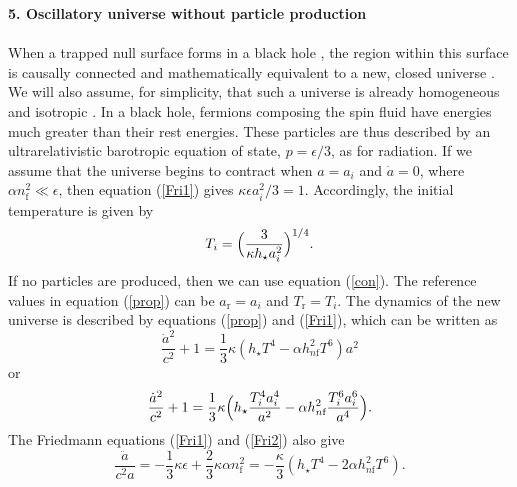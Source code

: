 \documentclass[prd,onecolumn,nofootinbib]{revtex4}
\begin{document}
{\bf 5. Oscillatory universe without particle production}\\ \\
When a trapped null surface forms in a black hole \cite{HoVi}, the region within this surface is causally connected and mathematically equivalent to a new, closed universe \cite{torsion1,num}.
We will also assume, for simplicity, that such a universe is already homogeneous and isotropic \cite{HoVi}.
In a black hole, fermions composing the spin fluid have energies much greater than their rest energies.
These particles are thus described by an ultrarelativistic barotropic equation of state, $p=\epsilon/3$, as for radiation.
If we assume that the universe begins to contract when $a=a_i$ and $\dot{a}=0$, where $\alpha n_\textrm{f}^2\ll\epsilon$, then equation (\ref{Fri1}) gives $\kappa\epsilon a_i^2/3=1$.
Accordingly, the initial temperature is given by
\begin{equation}
T_i=\Bigl(\frac{3}{\kappa h_\star a_i^2}\Bigr)^{1/4}.
\end{equation}
If no particles are produced, then we can use equation (\ref{con}).
The reference values in equation (\ref{prop}) can be $a_\textrm{r}=a_i$ and $T_\textrm{r}=T_i$.
The dynamics of the new universe is described by equations (\ref{prop}) and (\ref{Fri1}), which can be written as
\begin{equation}
\frac{{\dot{a}}^2}{c^2}+1=\frac{1}{3}\kappa(h_\star T^4-\alpha h_{n\textrm{f}}^2 T^6)a^2
\label{osc}
\end{equation}
or
\begin{equation}
\frac{{\dot{a}}^2}{c^2}+1=\frac{1}{3}\kappa\Bigl(h_\star\frac{T_i^4 a_i^4}{a^2}-\alpha h_{n\textrm{f}}^2\frac{T_i ^6 a_i^6}{a^4}\Bigr).
\end{equation}
The Friedmann equations (\ref{Fri1}) and (\ref{Fri2}) also give
\begin{equation}
\frac{\ddot{a}}{c^2 a}=-\frac{1}{3}\kappa\epsilon+\frac{2}{3}\kappa\alpha n_\textrm{f}^2=-\frac{\kappa}{3}(h_\star T^4-2\alpha h_{n\textrm{f}}^2 T^6).
\label{acc}
\end{equation}
\end{document}
